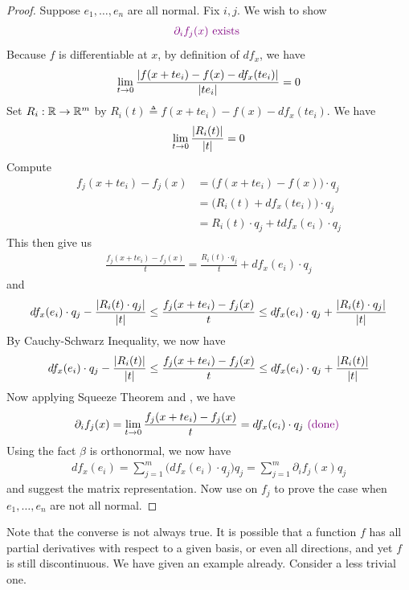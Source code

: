 \documentclass{report}
\begin{document}
\begin{proof}
Suppose $e_1,\dots ,e_n$ are all normal. Fix $i,j$. We wish to show 
 \begin{align*}
\textcolor{violet}{\partial_i f_j(x) \text{ exists }}
\end{align*}
Because $f$ is differentiable at $x$, by definition of $df_x$, we have
\begin{align*}
\lim_{t\to 0} \frac{\left|f(x+te_i)-f(x)-df_x(te_i)\right|}{\left|te_i\right|}=0
\end{align*}
Set $R_i:\mathbb{R}\rightarrow \mathbb{R}^m$ by $R_i(t)\triangleq f(x+te_i)-f(x)-df_x(te_i)$. We have 
\begin{align}
\label{Dij1}
  \lim_{t\to 0}\frac{\left|R_i(t)\right|}{\left|t\right|}=0
\end{align}
Compute
\begin{align*}
f_j(x+te_i)-f_j(x)&=\big(f(x+te_i)-f(x) \big)\cdot q_j\\
&=\big(R_i(t)+df_x(te_i) \big) \cdot q_j\\
&= R_i(t)\cdot q_j+ tdf_x(e_i)\cdot q_j
\end{align*}
This then give us 
\begin{align*}
\frac{f_j(x+te_i)-f_j(x)}{t}=\frac{R_i(t)\cdot q_j}{t}+ df_x(e_i)\cdot q_j
\end{align*}
and 
\begin{align*}
  df_x(e_i)\cdot q_j - \frac{\left|R_i(t)\cdot q_j\right|}{\left|t\right|} \leq \frac{f_j(x+te_i)-f_j(x)}{t}\leq df_x(e_i)\cdot q_j + \frac{\left|R_i(t)\cdot q_j\right|}{\left|t\right|}
\end{align*}
By Cauchy-Schwarz Inequality, we now have 
\begin{align*}
  df_x(e_i)\cdot q_j - \frac{\left|R_i(t)\right|}{\left|t\right|} \leq \frac{f_j(x+te_i)-f_j(x)}{t}\leq df_x(e_i)\cdot q_j + \frac{\left|R_i(t)\right|}{\left|t\right|}
\end{align*}
Now applying Squeeze Theorem and , we have  
\begin{align*}
\partial_i f_j(x)=\lim_{t\to 0} \frac{f_j(x+te_i)-f_j(x)}{t}=df_x(e_i)\cdot q_j \textcolor{violet}{\text{ (done) }}
\end{align*}
Using the fact $\beta $ is orthonormal, we now have 
\begin{align*}
df_x(e_i)=\sum_{j=1}^m \Big(df_x(e_i)\cdot q_j \Big)q_j=\sum_{j=1}^m \partial_if_j(x)q_j
\end{align*}
and suggest the matrix representation. Now use  on $f_j$ to prove the case when $e_1,\dots, e_n$ are not all normal.
\end{proof}
\begin{mdframed}
Note that the converse is not always true. It is possible that a function $f$ has all partial derivatives with respect to a given basis, or even all directions, and yet $f$ is still discontinuous. We have given an example already. Consider a less trivial one. 

\end{mdframed}
\end{document}
